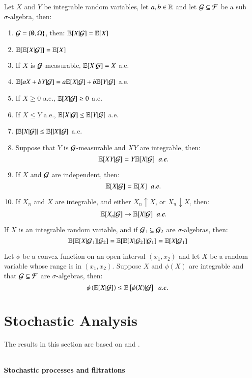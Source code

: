 \begin{theorem}
\label{thm: Conditional_expectation_rules}
Let $X$ and $Y$ be integrable random variables, let $a,b \in \mathbb{R}$ and let $\mathcal{G} \subseteq \mathcal{F}$ be a sub $\sigma$-algebra, then: 
\begin{enumerate}[label= (\roman*), , leftmargin=*]
    \item $\mathcal{G} = \{\emptyset, \Omega\}$, then: $\mathbb{E}[X|\mathcal{G}] = \mathbb{E}[X]$
    \item $\mathbb{E}[\mathbb{E}[X|\mathcal{G}]] = \mathbb{E}[X]$
    \item If $X$ is $\mathcal{G}$-measurable, $\mathbb{E}[X|\mathcal{G}] = X$ a.e.
    \item $\mathbb{E}[aX+bY|\mathcal{G}] = a\mathbb{E}[X|\mathcal{G}] + b\mathbb{E}[Y|\mathcal{G}]$ a.e. 
    \item If $X\geq 0$ a.e., $\mathbb{E}[X|\mathcal{G}] \geq 0$ a.e. 
    \item If $X\leq Y$ a.e., $\mathbb{E}[X|\mathcal{G}] \leq \mathbb{E}[Y|\mathcal{G}]$ a.e. 
    \item $|\mathbb{E}[X|\mathcal{G}]| \leq \mathbb{E}[|X||\mathcal{G}]$ a.e. 
    \item Suppose that $Y$ is $\mathcal{G}$-measurable and $XY$ are integrable, then: 
    \[
    \mathbb{E}[XY|\mathcal{G}] = Y\mathbb{E}[X|\mathcal{G}]\;\;a.e.
    \]
    \item If $X$ and $\mathcal{G}$ are independent, then: 
    \[
    \mathbb{E}[X|\mathcal{G}] = \mathbb{E}[X]\;\; a.e.
    \]
    \item If $X_{n}$ and $X$ are integrable, and either $X_{n} \uparrow X$, or $X_{n} \downarrow X$, then: 
    \[
    \mathbb{E}[X_{n}|\mathcal{G}] \to \mathbb{E}[X|\mathcal{G}]\;\; a.e.
    \]
\end{enumerate}
\end{theorem}

\begin{theorem}
\label{thm: Tower_law}
If $X$ is an integrable random variable, and if $\mathcal{G}_{1} \subseteq \mathcal{G}_{2}$ are $\sigma$-algebras, then: 
\[
\mathbb{E}[\mathbb{E}[X|\mathcal{G}_{1}]|\mathcal{G}_{2}] = \mathbb{E}[\mathbb{E}[X|\mathcal{G}_{2}]|\mathcal{G}_{1}] = \mathbb{E}[X|\mathcal{G}_{1}]
\]
\end{theorem}

\begin{theorem}
\label{thm: Jensen's_ineuality}
Let $\phi$ be a convex function on an open interval $(x_{1}, x_{2})$ and let $X$ be a random variable whose range is in $(x_{1}, x_{2})$. Suppose $X$ and $\phi(X)$ are integrable and that $\mathcal{G} \subseteq \mathcal{F}$ are $\sigma$-algebras, then: 
\[
\phi\left(\mathbb{E}[X|\mathcal{G}]\right) \leq \mathbb{E}\left[\phi(X)|\mathcal{G} \right]\;\;a.e.
\]
\end{theorem}

\newpage 
\section{Stochastic Analysis}
The results in this section are based on \cite{walsh2012knowing} and \cite{baldi2017stochastic}. 
\\~\\
\centerline{\textbf{Stochastic processes and filtrations}}

